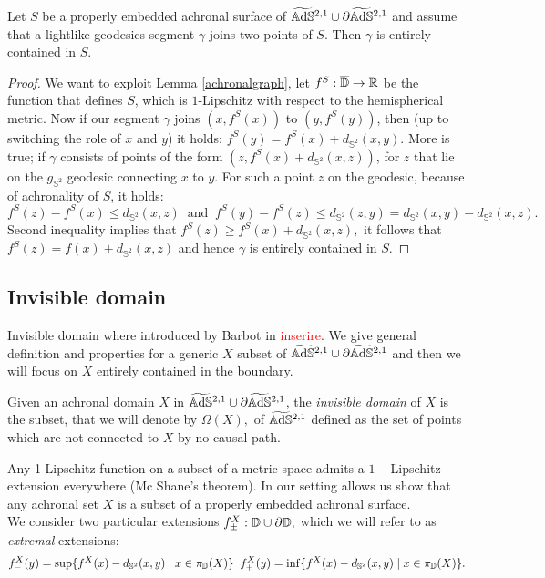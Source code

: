 \begin{lemma}\label{containedgeo}
    Let $S$ be a properly embedded achronal surface of $\widetilde{\mathbb{A}\mathrm{d}\mathbb{S}}{}^{2,1}\cup\partial\widetilde{\mathbb{A}\mathrm{d}\mathbb{S}}{}^{2,1}$ and assume that a lightlike geodesics segment $\gamma$ joins two points of $S$. Then $\gamma$ is entirely contained in $S.$
\end{lemma}
\begin{proof}
    We want to exploit Lemma \ref{achronalgraph}, let $f^S:\overline{\mathbb{D}}\to\mathbb{R}$ be the function that defines $S$, which is $1$-Lipschitz with respect to the hemispherical metric. Now if our segment $\gamma$ joins $(x,f^S(x))$ to $(y,f^S(y))$, then (up to switching the role of $x$ and $y$) it holds: $f^S(y)=f^S(x)+d_{\mathbb{S}^2}(x,y).$ More is true; if $\gamma$ consists of points of the form $(z,f^S(x)+d_{\mathbb{S}^2}(x,z))$, for $z$ that lie on the $g_{\mathbb{S}^2}$ geodesic connecting $x$ to $y$. For such a point $z$ on the geodesic, because of achronality of $S$, it holds: 
        \[
            f^S(z)-f^S(x)\leq d_{\mathbb{S}^2}(x,z)\;\;\text{and}\;\;f^S(y)-f^S(z)\leq d_{\mathbb{S}^2}(z,y)=d_{\mathbb{S}^2}(x,y)-d_{\mathbb{S}^2}(x,z).
        \]
        Second inequality implies that $f^S(z)\geq f^S(x)+d_{\mathbb{S}^2}(x,z),$ it follows that $f^S(z)=f(x)+d_{\mathbb{S}^2}(x,z)$ and hence $\gamma$ is entirely contained in $S.$
\end{proof}

\subsection{Invisible domain}
Invisible domain where introduced by Barbot in \textcolor{red}{inserire}. We give general definition and properties for a generic $X$ subset of $\widetilde{\mathbb{A}\mathrm{d}\mathbb{S}}{}^{2,1}\cup\partial  \widetilde{\mathbb{A}\mathrm{d}\mathbb{S}}{}^{2,1}$ and then we will focus on $X$ entirely contained in the boundary. 

\begin{definition}
    Given an achronal domain $X$ in $\widetilde{\mathbb{A}\mathrm{d}\mathbb{S}}{}^{2,1}\cup\partial\widetilde{\mathbb{A}\mathrm{d}\mathbb{S}}{}^{2,1}$, the \textit{invisible domain} of $X$ is the subset, that we will denote by $\Omega(X),$ of $\widetilde{\mathbb{A}\mathrm{d}\mathbb{S}}{}^{2,1}$ defined as the set of points which are not connected to $X$ by no causal path.   
\end{definition}

Any 1-Lipschitz function on a subset of a metric space admits a $1-$Lipschitz extension everywhere (Mc Shane's theorem). In our setting allows us show that any achronal set $X$ is a subset of a properly embedded achronal surface.\\
We consider two particular extensions $f_\pm^X:\mathbb{D}\cup\partial\mathbb{D},$ which we will refer to as \textit{extremal} extensions:
\[
    f_-^X(y)=\sup\{f^X(x)-d_{\mathbb{S}^2}(x,y)\;|\;x\in\pi_{\mathbb{D}}(X)\} \;\;     f_+^X(y)=\inf\{f^X(x)-d_{\mathbb{S}^2}(x,y)\;|\;x\in\pi_{\mathbb{D}}(X)\}.
\]

